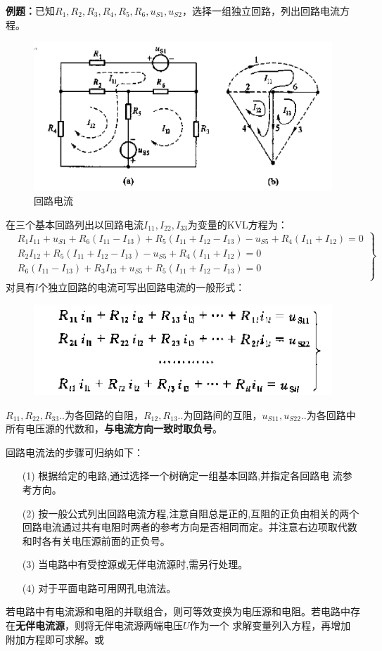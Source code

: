 \documentclass[11pt,a4paper,oneside]{book}
\begin{document}
\textbf{例题：}已知$R_1,R_2,R_3,R_4,R_5,R_6,u_{S1},u_{S2}$，选择一组独立回路，列出回路电流方程。
\begin{figure}[H]
	\centering
	\includegraphics[width=0.6\linewidth]{screenshot040}
	\caption{回路电流}
	\label{fig:screenshot040}
\end{figure}
在三个基本回路列出以回路电流$I_{11},I_{22},I_{33}$为变量的KVL方程为：
\begin{equation}
	\left.
	\begin{aligned}
		&R_1I_{11}+u_{S1}+R_6(I_{11}-I_{13})+R_5(I_{11}+I_{12}-I_{13})-u_{S5}+R_4(I_{11}+I_{12})=0 \\
		&R_2I_{12}+R_5(I_{11}+I_{12}-I_{13})-u_{S5}+R_4(I_{11}+I_{12})=0 \\
		&R_6(I_{11}-I_{13})+R_3I_{13}+u_{S5}+R_5(I_{11}+I_{12}-I_{13})=0\\
	\end{aligned}
	\right\}
\end{equation}
对具有$l$个独立回路的电流可写出回路电流的一般形式：
\begin{figure}[H]
	\centering
	\includegraphics[width=0.6\linewidth]{screenshot042}
	\caption{}
	\label{fig:screenshot042}
\end{figure}
$R_{11},R_{22},R_{33}..$为各回路的自阻，$R_{12},R_{13}..$为回路间的互阻，$u_{S11},u_{S22}..$为各回路中所有电压源的代数和，\textbf{与电流方向一致时取负号}。

回路电流法的步骤可归纳如下：
\begin{enumerate}\setlength{\itemsep}{0.2pt}
	\item[(1)]根据给定的电路,通过选择一个树确定一组基本回路,并指定各回路电
	流参考方向。
	\item[(2)]按一般公式列出回路电流方程,注意自阻总是正的,互阻的正负由相关的两个回路电流通过共有电阻时两者的参考方向是否相同而定。并注意右边项取代数和时各有关电压源前面的正负号。
	\item[(3)]当电路中有受控源或无伴电流源时,需另行处理。
	\item[(4)]对于平面电路可用网孔电流法。
\end{enumerate}
若电路中有电流源和电阻的并联组合，则可等效变换为电压源和电阻。若电路中存在\textbf{无伴电流源}，则将无伴电流源两端电压$U$作为一个 求解变量列入方程，再增加附加方程即可求解。或
\end{document}
